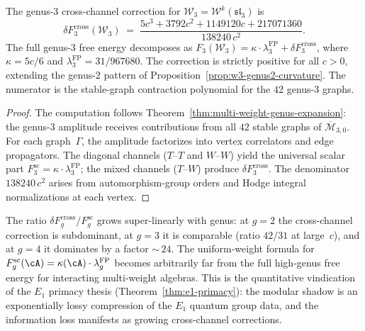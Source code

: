 \begin{proposition}\label{prop:w3-genus3-cross-channel}
The genus-$3$ cross-channel correction for
$\mathcal{W}_3 = \mathcal{W}^k(\mathfrak{sl}_3)$ is
\begin{equation}\label{eq:w3-delta-F3-cross}
\delta F_3^{\mathrm{cross}}(\mathcal{W}_3)
\;=\;
\frac{5c^3 + 3792c^2 + 1149120c + 217071360}{138240\, c^2}.
\end{equation}
The full genus-$3$ free energy decomposes as
$F_3(\mathcal{W}_3) = \kappa \cdot \lambda_3^{\mathrm{FP}}
+ \delta F_3^{\mathrm{cross}}$, where
$\kappa = 5c/6$ and $\lambda_3^{\mathrm{FP}} = 31/967680$.
The correction is strictly positive for all $c > 0$,
extending the genus-$2$ pattern of
Proposition~\textup{\ref{prop:w3-genus2-curvature}}.
The numerator is the stable-graph contraction polynomial for the
$42$ genus-$3$ graphs.
\end{proposition}

\begin{proof}
The computation follows
Theorem~\ref{thm:multi-weight-genus-expansion}: the genus-$3$
amplitude receives contributions from all $42$ stable graphs of
$\overline{\mathcal{M}}_{3,0}$. For each graph~$\Gamma$, the
amplitude factorizes into vertex correlators and edge propagators.
The diagonal channels ($T$--$T$ and $W$--$W$) yield the universal
scalar part \(F_3^{\mathrm{sc}}=\kappa \cdot \lambda_3^{\mathrm{FP}}\);
the mixed channels
($T$--$W$) produce $\delta F_3^{\mathrm{cross}}$.
The denominator $138240\, c^2$ arises from automorphism-group orders
and Hodge integral normalizations at each vertex.
\end{proof}

\begin{remark}

\label{rem:cross-channel-dominance}
The ratio $\delta F_g^{\mathrm{cross}} / F_g^{\mathrm{sc}}$
grows super-linearly with genus: at $g = 2$ the cross-channel
correction is subdominant, at $g = 3$ it is comparable
(ratio $42/31$ at large~$c$), and at $g = 4$ it dominates by a
factor ${\sim}\,24$. The uniform-weight formula
for \(F_g^{\mathrm{sc}}(\cA)
= \kappa(\cA) \cdot \lambda_g^{\mathrm{FP}}\) becomes arbitrarily
far from the full high-genus free energy for interacting
multi-weight algebras.
This is the quantitative vindication of the $E_1$ primacy thesis
(Theorem~\ref{thm:e1-primacy}): the modular shadow is an
exponentially lossy compression of the $E_1$ quantum group data,
and the information loss manifests as growing cross-channel
corrections.
\end{remark}


